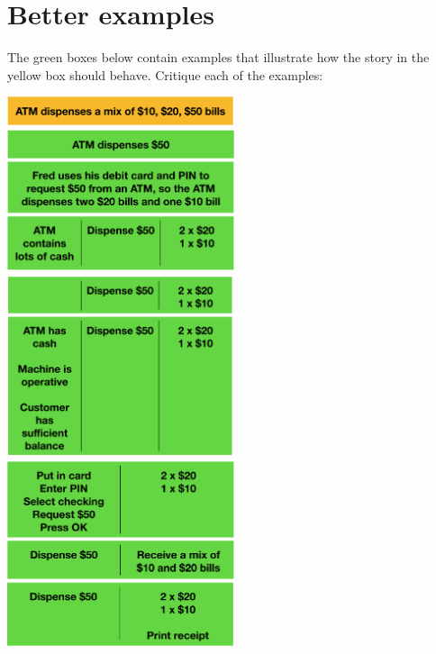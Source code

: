 \chapter*{Better examples}

\ifnotes

\fi

\ifcontent
    The green boxes below contain examples that illustrate how the story in the yellow box should behave. Critique each of the examples:

    \begin{center}
        \includegraphics[width=0.5\textwidth, keepaspectratio]{images/atm-story}
        \includegraphics[width=0.5\textwidth, keepaspectratio]{images/atm-examples-1}
        \includegraphics[width=0.5\textwidth, keepaspectratio]{images/atm-examples-2}
        \includegraphics[width=0.5\textwidth, keepaspectratio]{images/atm-examples-3}
    \end{center}
    
\fi